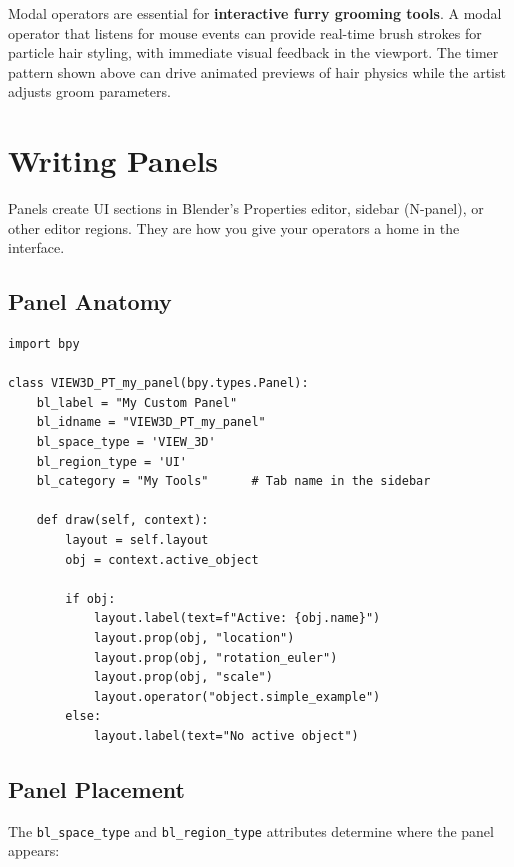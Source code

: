 \begin{furrybox}
Modal operators are essential for \textbf{interactive furry grooming tools}. A modal operator that listens for mouse events can provide real-time brush strokes for particle hair styling, with immediate visual feedback in the viewport. The timer pattern shown above can drive animated previews of hair physics while the artist adjusts groom parameters.
\end{furrybox}


\section{Writing Panels}
\label{sec:scripting-panels}

Panels create UI sections in Blender's Properties editor, sidebar (N-panel), or other editor regions. They are how you give your operators a home in the interface.

\subsection{Panel Anatomy}

\begin{lstlisting}
import bpy

class VIEW3D_PT_my_panel(bpy.types.Panel):
    bl_label = "My Custom Panel"
    bl_idname = "VIEW3D_PT_my_panel"
    bl_space_type = 'VIEW_3D'
    bl_region_type = 'UI'
    bl_category = "My Tools"      # Tab name in the sidebar

    def draw(self, context):
        layout = self.layout
        obj = context.active_object

        if obj:
            layout.label(text=f"Active: {obj.name}")
            layout.prop(obj, "location")
            layout.prop(obj, "rotation_euler")
            layout.prop(obj, "scale")
            layout.operator("object.simple_example")
        else:
            layout.label(text="No active object")
\end{lstlisting}

\subsection{Panel Placement}

The \texttt{bl\_space\_type} and \texttt{bl\_region\_type} attributes determine where the panel appears:

